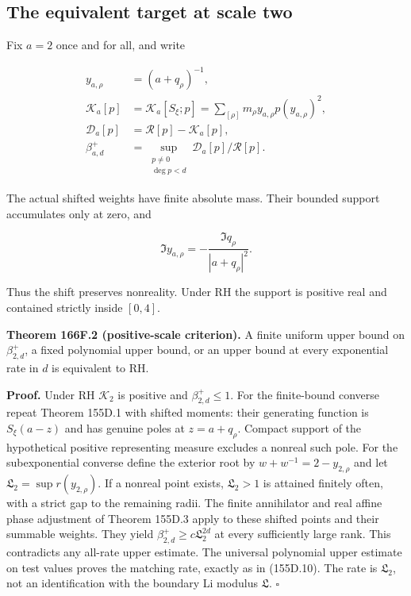 \documentclass[
  11pt,
]{book}
\begin{document}
\subsection{The equivalent target at scale
two}\label{the-equivalent-target-at-scale-two}

Fix \(a=2\) once and for all, and write

\[
\begin{aligned}
y_{a,\rho}&=(a+q_\rho)^{-1},\\
\mathcal K_a[p]&=\mathcal K_a[S_\xi;p]
 =\sum_{[\rho]}m_\rho y_{a,\rho}p(y_{a,\rho})^2,\\
\mathcal D_a[p]&=\mathcal R[p]-\mathcal K_a[p],\\
\beta_{a,d}^+&=\sup_{\substack{p\ne0\\\deg p<d}}
 \mathcal D_a[p]/\mathcal R[p].
\end{aligned}
\tag{166F.4}
\]

The actual shifted weights have finite absolute mass. Their bounded
support accumulates only at zero, and

\[
\Im y_{a,\rho}=-\frac{\Im q_\rho}{|a+q_\rho|^2}.
\tag{166F.5}
\]

Thus the shift preserves nonreality. Under RH the support is positive
real and contained strictly inside \([0,4]\).

\textbf{Theorem 166F.2 (positive-scale criterion).} A finite uniform
upper bound on \(\beta_{2,d}^+\), a fixed polynomial upper bound, or an
upper bound at every exponential rate in \(d\) is equivalent to RH.

\textbf{Proof.} Under RH \(\mathcal K_2\) is positive and
\(\beta_{2,d}^+\le1\). For the finite-bound converse repeat Theorem
155D.1 with shifted moments: their generating function is \(S_\xi(a-z)\)
and has genuine poles at \(z=a+q_\rho\). Compact support of the
hypothetical positive representing measure excludes a nonreal such pole.
For the subexponential converse define the exterior root by
\(w+w^{-1}=2-y_{2,\rho}\) and let \(\mathfrak L_2=\sup r(y_{2,\rho})\).
If a nonreal point exists, \(\mathfrak L_2>1\) is attained finitely
often, with a strict gap to the remaining radii. The finite annihilator
and real affine phase adjustment of Theorem 155D.3 apply to these
shifted points and their summable weights. They yield
\(\beta_{2,d}^+\ge c\mathfrak L_2^{2d}\) at every sufficiently large
rank. This contradicts any all-rate upper estimate. The universal
polynomial upper estimate on test values proves the matching rate,
exactly as in (155D.10). The rate is \(\mathfrak L_2\), not an
identification with the boundary Li modulus \(\mathfrak L\). \(\square\)
\end{document}
